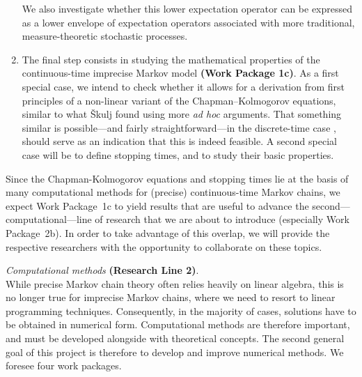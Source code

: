 \documentclass[11pt,dvipsnames,usenames,a4paper]{article}
\begin{document}
\begin{enumerate}[label=\tiny$\blacksquare$,leftmargin=*,noitemsep]
We also investigate whether this lower expectation operator can be expressed as a lower envelope of expectation operators associated with more traditional, measure-theoretic stochastic processes.
\item The final step consists in studying the mathematical properties of the continuous-time imprecise Markov model {\bf(Work Package 1c)}.
As a first special case, we intend to check whether it allows for a derivation from first principles of a non-linear variant of the Chapman--Kolmogorov equations, similar to what \v{S}kulj \cite{skulj2015} found using more {\itshape ad hoc} arguments.
That something similar is possible---and fairly straightforward---in the discrete-time case \cite{cooman2008}, should serve as an indication that this is indeed feasible. 
A second special case will be to define stopping times, and to study their basic properties.
\end{enumerate}
Since the Chapman-Kolmogorov equations and stopping times lie at the basis of many computational methods for (precise) continuous-time Markov chains, we expect Work Package~1c to yield results that are useful to advance the second---computational---line of research that we are about to introduce (especially Work Package~2b). In order to take advantage of this overlap, we will provide the respective researchers with the opportunity to collaborate on these topics.

\emph{Computational methods} {\bf (Research Line 2)}.\\[3pt]
While precise Markov chain theory often relies heavily on linear algebra, this is no longer true for imprecise Markov chains, where we need to resort to linear programming techniques. 
Consequently, in the majority of cases, solutions have to be obtained in numerical form.
Computational methods are therefore important, and must be developed alongside with theoretical concepts. 
The second general goal of this project is therefore to develop and improve numerical methods. We foresee four work packages.
\end{document}
